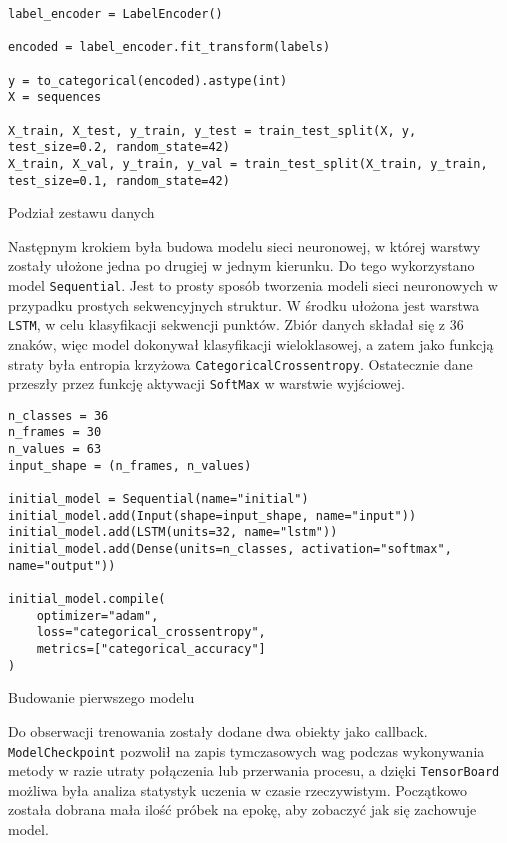 \begin{listing}[H]
    \color{white}
    \begin{verbatim}
label_encoder = LabelEncoder()

encoded = label_encoder.fit_transform(labels)

y = to_categorical(encoded).astype(int)
X = sequences

X_train, X_test, y_train, y_test = train_test_split(X, y, test_size=0.2, random_state=42)
X_train, X_val, y_train, y_val = train_test_split(X_train, y_train, test_size=0.1, random_state=42)
    \end{verbatim}
    \caption{Podział zestawu danych}
    \label{lst:dataset-splitting}
\end{listing}

Następnym krokiem była budowa modelu sieci neuronowej, w której warstwy zostały ułożone jedna po drugiej w jednym kierunku. Do tego wykorzystano model \texttt{Sequential}. Jest to prosty sposób tworzenia modeli sieci neuronowych w przypadku prostych sekwencyjnych struktur. W środku ułożona jest warstwa \texttt{LSTM}, w celu klasyfikacji sekwencji punktów. Zbiór danych składał się z 36 znaków, więc model dokonywał klasyfikacji wieloklasowej, a zatem jako funkcją straty była entropia krzyżowa \texttt{CategoricalCrossentropy}. Ostatecznie dane przeszły przez funkcję aktywacji \texttt{SoftMax} w warstwie wyjściowej.

\begin{listing}[H]
    \color{white}
    \begin{verbatim}
n_classes = 36
n_frames = 30
n_values = 63
input_shape = (n_frames, n_values)

initial_model = Sequential(name="initial")
initial_model.add(Input(shape=input_shape, name="input"))
initial_model.add(LSTM(units=32, name="lstm"))
initial_model.add(Dense(units=n_classes, activation="softmax", name="output"))

initial_model.compile(
    optimizer="adam",
    loss="categorical_crossentropy",
    metrics=["categorical_accuracy"]
)
    \end{verbatim}
    \caption{Budowanie pierwszego modelu}
    \label{lst:initial-model-building}
\end{listing}

Do obserwacji trenowania zostały dodane dwa obiekty jako callback. \texttt{ModelCheckpoint} pozwolił na zapis tymczasowych wag podczas wykonywania metody w razie utraty połączenia lub przerwania procesu, a dzięki \texttt{TensorBoard} możliwa była analiza statystyk uczenia w czasie rzeczywistym. Początkowo została dobrana mała ilość próbek na epokę, aby zobaczyć jak się zachowuje model.

